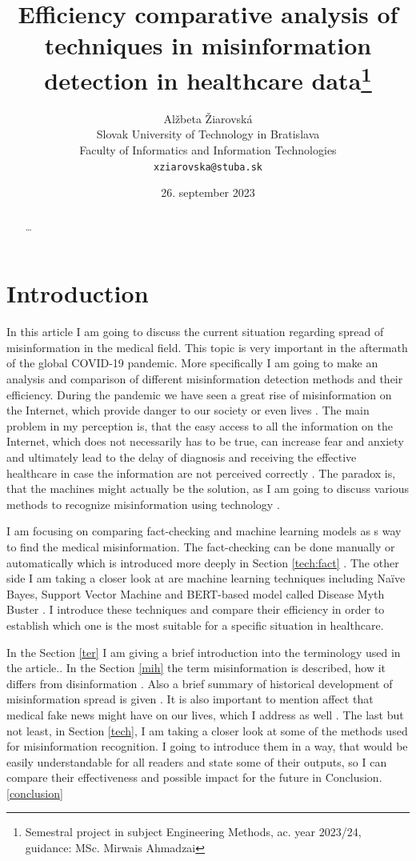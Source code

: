 \documentclass[11pt ,english,a4paper]{article}
\title{Efficiency comparative analysis of techniques in misinformation detection in healthcare data\thanks{Semestral project in subject Engineering Methods, ac. year 2023/24, guidance: MSc. Mirwais Ahmadzai}}
\author{Alžbeta Žiarovská\\[2pt]
	{\small Slovak University of Technology in Bratislava}\\
	{\small Faculty of Informatics and Information Technologies}\\
	{\small \texttt{xziarovska@stuba.sk}}
	}
\date{\small 26. september 2023}
\begin{document}
\maketitle
\newpage

\begin{abstract}
\ldots
\end{abstract}
\newpage

\section{Introduction}\label{intro}

In this article I am going to discuss the current situation regarding spread of misinformation in the medical field. This topic is very important in the aftermath of the global COVID-19 pandemic. More specifically I am going to make an analysis and comparison of different misinformation detection methods and their efficiency. During the pandemic we have seen a great rise of misinformation on the Internet, which provide danger to our society or even lives \cite{war18dr}. The main problem in my perception is, that the easy access to all the information on the Internet, which does not necessarily has to be true, can increase fear and anxiety and ultimately lead to the delay of diagnosis and receiving the effective healthcare in case the information are not perceived correctly \cite{wa19sys}. The paradox is, that the machines might actually be the solution, as I am going to discuss various methods to recognize misinformation using technology \cite{chap22unmask}.

I am focusing on comparing fact-checking and machine learning models as s way to find the medical misinformation. The fact-checking can be done manually or automatically which is introduced more deeply in Section \ref{tech:fact} \cite{bar21health}. The other side I am taking a closer look at are machine learning techniques including Naïve Bayes, Support Vector Machine and BERT-based model called Disease Myth Buster \cite{bar21health} \cite{chap22unmask}. I introduce these techniques and compare their efficiency in order to establish which one is the most suitable for a specific situation in healthcare.

In the Section \ref{ter} I am giving a brief introduction into the terminology used in the article.. In the Section \ref{mih} the term misinformation is described, how it differs from disinformation \cite{gu20misinfo}. Also a brief summary of historical development of misinformation spread is given \cite{pos18short}. It is also important to mention affect that medical fake news might have on our lives, which I address as well \cite{who22infodemics}. The last but not least, in Section \ref{tech}, I am taking a closer look at some of the methods used for misinformation recognition. I going to introduce them in a way, that would be easily understandable for all readers and state some of their outputs, so I can compare their effectiveness and possible impact for the future in Conclusion. \ref{conclusion}
\end{document}

